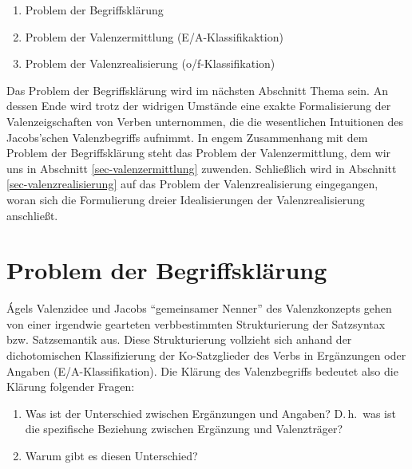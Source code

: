 \begin{enumerate}\setlength{\itemsep}{-.5ex}
  \item Problem der Begriffsklärung
  \item Problem der Valenzermittlung (E/A-Klassifikaktion)
  \item Problem der Valenzrealisierung (o/f-Klassifikation)
\end{enumerate}   
Das Problem der Begriffsklärung wird im nächsten Abschnitt Thema sein. An dessen Ende wird trotz der widrigen Umstände eine exakte Formalisierung der Valenzeigschaften von Verben unternommen, die die wesentlichen Intuitionen des Jacobs'schen Valenzbegriffs aufnimmt. In engem Zusammenhang mit dem Problem der Begriffsklärung steht das Problem der Valenzermittlung, dem wir uns in Abschnitt \ref{sec-valenzermittlung} zuwenden. Schlie\ss lich wird in Abschnitt \ref{sec-valenzrealisierung} auf das Problem der Valenzrealisierung eingegangen, woran sich die Formulierung dreier Idealisierungen der Valenzrealisierung anschließt. 





\section{Problem der Begriffsklärung} \label{sec-valenzbegriff}


\'Agels Valenzidee und Jacobs "`gemeinsamer Nenner"' des Valenzkonzepts gehen von einer irgendwie gearteten verbbestimmten Strukturierung der Satzsyntax bzw. Satzsemantik aus. Diese Strukturierung vollzieht sich anhand der dichotomischen Klassifizierung der Ko-Satzglieder des Verbs in Ergänzungen oder Angaben (E/A-Klassifikation). Die Klärung des Valenzbegriffs bedeutet also die Klärung folgender Fragen:

\begin{enumerate}
	\item Was ist der Unterschied zwischen Ergänzungen und Angaben? D.\,h.\ was ist die spezifische Beziehung zwischen Ergänzung und Valenzträger?
	\item Warum gibt es diesen Unterschied?   
\end{enumerate}

